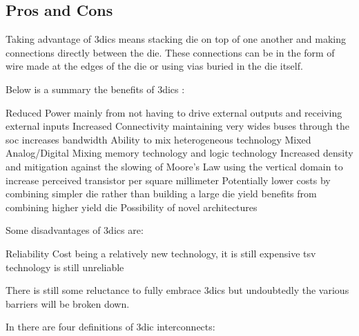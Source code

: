 \subsection{Pros and Cons}
\label{sec:3dic benefits}

Taking advantage of \acp{3dic} means stacking die on top of one another and making connections directly between the die. These connections can be in the form of wire made at the edges of the die or using vias buried in the die itself.


Below is a summary the benefits of \acp{3dic} :
\begin{outline}
  \1 Reduced Power
    \2 mainly from not having to drive external outputs and receiving external inputs
  \1 Increased Connectivity
    \2 maintaining very wides buses through the \ac{soc} increases bandwidth
  \1 Ability to mix heterogeneous technology
    \2 Mixed Analog/Digital
    \2 Mixing memory technology and logic technology
  \1 Increased density and mitigation against the slowing of Moore's Law
    \2 using the vertical domain to increase perceived transistor per square millimeter
  \1 Potentially lower costs by combining simpler die rather than building a large die
    \2 yield benefits from combining higher yield die
  \1 Possibility of novel architectures \cite{Kim2016}
\end{outline}

Some disadvantages of \acp{3dic} are:
\begin{outline}
  \1 Reliability
  \1 Cost
    \2 being a relatively new technology, it is still expensive 
    \2 \ac{tsv} technology is still unreliable
\end{outline}

There is still some reluctance to fully embrace \acp{3dic} but undoubtedly the various barriers will be broken down.
\iffalse
The ability to mix technology targeted toward \ac{dram} with \acs{cmos} is something of which this work takes advantage.
\fi

In \cite{itrs2015_interconn} there are four definitions of \ac{3dic} interconnects:

